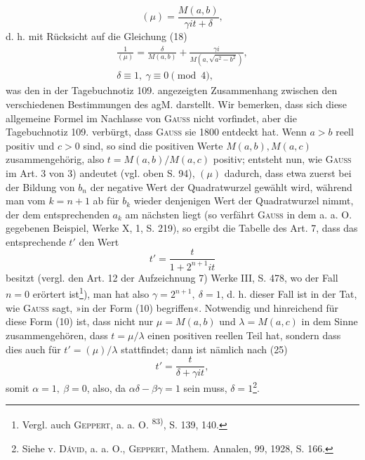 \[
(\mu)=\frac{M(a,b)}{\gamma it+\delta},
\]
\noindent d. h. mit Rücksicht auf die Gleichung (18)
\begingroup\makeatletter\tagsleft@true\let\veqno\leqno\makeatother
\begin{equation*}
\begin{gathered}
\frac1{(\mu)}=\frac\delta{M(a,b)}+\frac{\gamma i}{M(a,\sqrt{a^2-b^2})},\\
\delta\equiv1,\ \gamma\equiv0\pmod4,
\end{gathered}\tag{25}
\end{equation*}
\endgroup
\noindent was den in der Tagebuchnotiz 109. angezeigten Zusammenhang zwischen den
verschiedenen Bestimmungen des agM. darstellt. Wir bemerken, dass sich
diese allgemeine Formel im Nachlasse von \textsc{Gauss} nicht vorfindet, aber die
Tagebuchnotiz 109. verbürgt, dass \textsc{Gauss} sie 1800 entdeckt hat. Wenn \(a>b\)
reell positiv und \(c>0\) sind, so sind die positiven Werte \(M(a,b),M(a,c)\) zusammengehörig,
also \(t=M(a,b)/M(a,c)\) positiv; entsteht nun, wie \textsc{Gauss} im
Art. 3 von 3) andeutet (vgl. oben S. 94), \((\mu)\) dadurch, dass etwa zuerst bei
der Bildung von \(b_n\) der negative Wert der Quadratwurzel gewählt wird, während
man vom \(k=n+1\) ab für \(b_k\) wieder denjenigen Wert der Quadratwurzel
nimmt, der dem entsprechenden \(a_k\) am nächsten liegt (so verfährt \textsc{Gauss} in
dem a. a. O. gegebenen Beispiel, Werke X, 1, S. 219), so ergibt die Tabelle
des Art. 7, dass das entsprechende \(t'\) den Wert
\[
t'=\frac t{1+2^{n+1}it}
\]
\noindent besitzt (vergl. den Art. 12 der Aufzeichnung 7) Werke III, S. 478, wo der
Fall \(n=0\) erörtert ist\footnote{Vergl. auch \textsc{Geppert}, a. a. O. \textsuperscript{83)}, S. 139, 140.}), man hat also \(\gamma=2^{n+1},\ \delta=1\), d. h. dieser Fall
ist in der Tat, wie \textsc{Gauss} sagt, »in der Form (10) begriffen«. Notwendig und
hinreichend für diese Form (10) ist, dass nicht nur \(\mu=M(a,b)\) und \(\lambda=M(a,c)\)
in dem Sinne zusammengehören, dass \(t=\mu/\lambda\) einen positiven reellen Teil hat,
sondern dass dies auch für \(t'=(\mu)/\lambda\) stattfindet; dann ist nämlich nach (25)
\clearpage{}
\[
t'=\frac t{\delta+\gamma it},
\]
\noindent somit \(\alpha=1,\ \beta=0\), also, da \(\alpha\delta-\beta\gamma=1\) sein muss, \(\delta=1\)\footnote{Siehe v. \textsc{Dávid}, a. a. O., \textsc{Geppert}, Mathem. Annalen, 99, 1928, S. 166.}.

